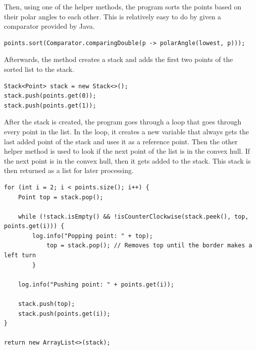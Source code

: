     Then, using one of the helper methods, the program sorts the points based on their polar angles to each other. This is relatively easy to do by given a comparator provided by Java.

    \begin{verbatim}
points.sort(Comparator.comparingDouble(p -> polarAngle(lowest, p)));
    \end{verbatim}

    Afterwards, the method creates a stack and adds the first two points of the sorted list to the stack. 
    \begin{verbatim}
Stack<Point> stack = new Stack<>();
stack.push(points.get(0));
stack.push(points.get(1));
    \end{verbatim}

    After the stack is created, the program goes through a loop that goes through every point in the list. In the loop, it creates a new variable that always gets the last added point of the stack and uses it as a reference point. Then the other helper method is used to look if the next point of the list is in the convex hull. If the next point is in the convex hull, then it gets added to the stack. This stack is then returned as a list for later processing.
    \begin{verbatim}
for (int i = 2; i < points.size(); i++) {
    Point top = stack.pop();

    while (!stack.isEmpty() && !isCounterClockwise(stack.peek(), top, points.get(i))) {
        log.info("Popping point: " + top);
            top = stack.pop(); // Removes top until the border makes a left turn
        }

    log.info("Pushing point: " + points.get(i));

    stack.push(top);
    stack.push(points.get(i));
}

return new ArrayList<>(stack);
    \end{verbatim}

